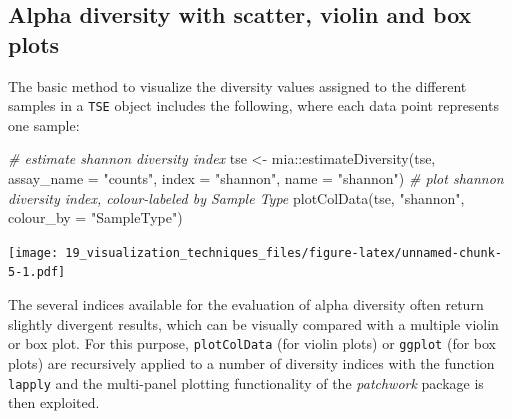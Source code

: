 \documentclass[
]{book}
\newenvironment{Shaded}{\begin{snugshade}}{\end{snugshade}}
\newcommand{\AttributeTok}[1]{\textcolor[rgb]{0.77,0.63,0.00}{#1}}
\newcommand{\CommentTok}[1]{\textcolor[rgb]{0.56,0.35,0.01}{\textit{#1}}}
\newcommand{\FunctionTok}[1]{\textcolor[rgb]{0.00,0.00,0.00}{#1}}
\newcommand{\NormalTok}[1]{#1}
\newcommand{\OtherTok}[1]{\textcolor[rgb]{0.56,0.35,0.01}{#1}}
\newcommand{\SpecialCharTok}[1]{\textcolor[rgb]{0.00,0.00,0.00}{#1}}
\newcommand{\StringTok}[1]{\textcolor[rgb]{0.31,0.60,0.02}{#1}}
\begin{document}
\hypertarget{alpha-diversity-with-scatter-violin-and-box-plots}{%
\subsection{Alpha diversity with scatter, violin and box plots}\label{alpha-diversity-with-scatter-violin-and-box-plots}}

The basic method to visualize the diversity values assigned to the different
samples in a \texttt{TSE} object includes the following, where each data point represents one sample:

\begin{Shaded}
\begin{Highlighting}[]
\CommentTok{\# estimate shannon diversity index}
\NormalTok{tse }\OtherTok{\textless{}{-}}\NormalTok{ mia}\SpecialCharTok{::}\FunctionTok{estimateDiversity}\NormalTok{(tse, }
                              \AttributeTok{assay\_name =} \StringTok{"counts"}\NormalTok{,}
                              \AttributeTok{index =} \StringTok{"shannon"}\NormalTok{, }
                              \AttributeTok{name =} \StringTok{"shannon"}\NormalTok{)}
\CommentTok{\# plot shannon diversity index, colour{-}labeled by Sample Type}
\FunctionTok{plotColData}\NormalTok{(tse, }\StringTok{"shannon"}\NormalTok{, }\AttributeTok{colour\_by =} \StringTok{"SampleType"}\NormalTok{)}
\end{Highlighting}
\end{Shaded}

\texttt{[image: 19\_visualization\_techniques\_files/figure-latex/unnamed-chunk-5-1.pdf]}

The several indices available for the evaluation of alpha diversity often return
slightly divergent results, which can be visually compared with a multiple violin
or box plot. For this purpose, \texttt{plotColData} (for violin plots) or \texttt{ggplot}
(for box plots) are recursively applied to a number of diversity indices with
the function \texttt{lapply} and the multi-panel plotting functionality of the
\emph{patchwork} package is then exploited.
\end{document}
